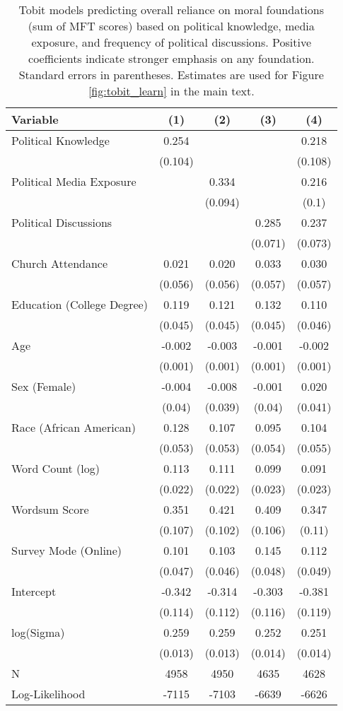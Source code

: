 \begin{table}[ht]
\centering
\caption{Tobit models predicting overall reliance on moral foundations
           (sum of MFT scores) based on political knowledge, media exposure, and frequency of 
           political discussions. Positive coefficients indicate stronger emphasis on any foundation.
           Standard errors in parentheses. Estimates are used for Figure \ref{fig:tobit_learn} in 
           the main text.} 
\label{tab:tobit_learn}
\begingroup\footnotesize
\begin{tabular}{lcccc}
  \hline
Variable & (1) & (2) & (3) & (4) \\ 
  \hline
Political Knowledge &  0.254 &  &  &  0.218 \\ 
   & (0.104) &  &  & (0.108) \\ 
  Political Media Exposure &  &  0.334 &  &  0.216 \\ 
   &  & (0.094) &  & (0.1) \\ 
  Political
Discussions &  &  &  0.285 &  0.237 \\ 
   &  &  & (0.071) & (0.073) \\ 
  Church Attendance &  0.021 &  0.020 &  0.033 &  0.030 \\ 
   & (0.056) & (0.056) & (0.057) & (0.057) \\ 
  Education (College Degree) &  0.119 &  0.121 &  0.132 &  0.110 \\ 
   & (0.045) & (0.045) & (0.045) & (0.046) \\ 
  Age & -0.002 & -0.003 & -0.001 & -0.002 \\ 
   & (0.001) & (0.001) & (0.001) & (0.001) \\ 
  Sex (Female) & -0.004 & -0.008 & -0.001 &  0.020 \\ 
   & (0.04) & (0.039) & (0.04) & (0.041) \\ 
  Race (African American) &  0.128 &  0.107 &  0.095 &  0.104 \\ 
   & (0.053) & (0.053) & (0.054) & (0.055) \\ 
  Word Count (log) &  0.113 &  0.111 &  0.099 &  0.091 \\ 
   & (0.022) & (0.022) & (0.023) & (0.023) \\ 
  Wordsum Score &  0.351 &  0.421 &  0.409 &  0.347 \\ 
   & (0.107) & (0.102) & (0.106) & (0.11) \\ 
  Survey Mode (Online) &  0.101 &  0.103 &  0.145 &  0.112 \\ 
   & (0.047) & (0.046) & (0.048) & (0.049) \\ 
  Intercept & -0.342 & -0.314 & -0.303 & -0.381 \\ 
   & (0.114) & (0.112) & (0.116) & (0.119) \\ 
  log(Sigma) &  0.259 &  0.259 &  0.252 &  0.251 \\ 
   & (0.013) & (0.013) & (0.014) & (0.014) \\ 
   \hline
N & 4958 & 4950 & 4635 & 4628 \\ 
  Log-Likelihood & -7115 & -7103 & -6639 & -6626 \\ 
   \hline
\end{tabular}
\endgroup
\end{table}
